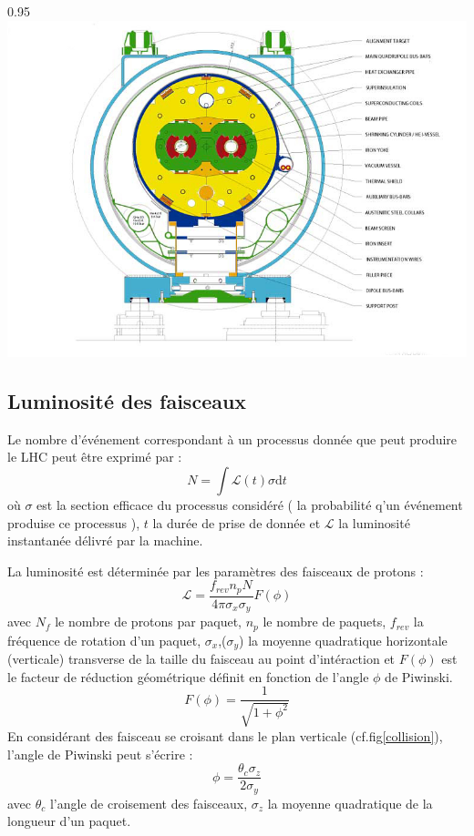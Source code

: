 \begin{minipagewithmarginpars}[h]{0.95\textwidth}
\centering
\includegraphics[width=1.0\textwidth]{LHC/dipole.jpg}
\label{dipole}	
\end{minipagewithmarginpars}

\subsection{Luminosité des faisceaux}
Le nombre d'événement correspondant à un processus donnée que peut produire le LHC peut être exprimé par :
\begin{equation}
N=\int \mathcal{L}(t)\sigma \mathrm dt
\end{equation}
où $\sigma$ est la section efficace du processus considéré ( la probabilité q'un événement produise ce processus ), $t$ la durée de prise de donnée et $\mathcal{L}$ la luminosité instantanée délivré par la machine.

La luminosité est déterminée par les paramètres des faisceaux de protons :
\begin{equation}
\mathcal{L}=\frac{f_{rev}n_{p}N_{}}{4\pi \sigma_{x} \sigma_{y}} F(\phi)
\end{equation}
avec $N_{f}$ le nombre de protons par paquet, $n_{p}$ le nombre de paquets, $f_{rev}$ la fréquence de rotation d'un paquet, $\sigma_{x}$,($\sigma_{y}$) la moyenne quadratique horizontale (verticale) transverse de la taille du faisceau au point d'intéraction et $F(\phi)$ est le facteur de réduction géométrique définit en fonction de l'angle $\phi$ de Piwinski.
\begin{equation}
F(\phi)=\frac{1}{\sqrt{1+\phi^{2}}}
\end{equation}
En considérant des faisceau se croisant dans le plan verticale (cf.fig\ref{collision}), l'angle de Piwinski peut s'écrire :
\begin{equation}
\phi=\frac{\theta_{c}\sigma_{z}}{2\sigma_{y}}
\end{equation}
avec $\theta_{c}$ l'angle de croisement des faisceaux, $\sigma_{z}$ la moyenne quadratique de la longueur d'un paquet.


